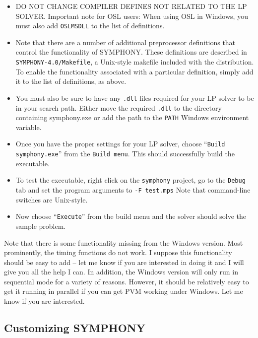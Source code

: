 \begin{itemize}
\item DO NOT CHANGE COMPILER DEFINES NOT RELATED TO THE LP SOLVER. Important note
for OSL users: When using OSL in Windows, you must also add \texttt{OSLMSDLL}
to the list of definitions.

\item Note that there are a number of additional preprocessor definitions that
control the functionality of SYMPHONY. These definitions are described in
\texttt{SYMPHONY-4.0/Makefile}, a Unix-style makefile included with the
distribution. To enable the functionality associated with a particular
definition, simply add it to the list of definitions, as above.

\item You must also be sure to have any \texttt{.dll} files required for your
LP solver to be in your search path. Either move the required \texttt{.dll} to
the directory containing symphony.exe or add the path to the \texttt{PATH}
Windows environment variable.

\item Once you have the proper settings for your LP solver, choose ``\texttt{Build
symphony.exe}'' from the \texttt{Build menu}. This should successfully build
the executable.

\item To test the executable, right click on the \texttt{symphony} project, go
to the \texttt{Debug} tab and set the program arguments to \texttt{-F
test.mps} Note that command-line switches are Unix-style.

\item Now choose ``\texttt{Execute}'' from the build menu and the solver
should solve the sample problem.

\end{itemize}

Note that there is some functionality missing from the Windows version. Most
prominently, the timing functions do not work. I suppose this functionality
should be easy to add -- let me know if you are interested in doing it and I
will give you all the help I can. In addition, the Windows version will only
run in sequential mode for a variety of reasons. However, it should be
relatively easy to get it running in parallel if you can get PVM working under
Windows. Let me know if you are interested.

\subsection{Customizing SYMPHONY}

